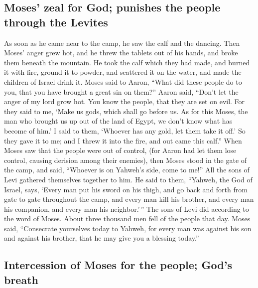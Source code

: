 \hypertarget{moses-zeal-for-god-punishes-the-people-through-the-levites}{%
\subsection{Moses' zeal for God; punishes the people through the
Levites}\label{moses-zeal-for-god-punishes-the-people-through-the-levites}}

 As soon as he came near to the camp, he saw the calf and
the dancing. Then Moses' anger grew hot, and he threw the tablets out of
his hands, and broke them beneath the mountain.  He took
the calf which they had made, and burned it with fire, ground it to
powder, and scattered it on the water, and made the children of Israel
drink it.  Moses said to Aaron, ``What did these people
do to you, that you have brought a great sin on them?'' 
Aaron said, ``Don't let the anger of my lord grow hot. You know the
people, that they are set on evil.  For they said to me,
`Make us gods, which shall go before us. As for this Moses, the man who
brought us up out of the land of Egypt, we don't know what has become of
him.'  I said to them, `Whoever has any gold, let them
take it off.' So they gave it to me; and I threw it into the fire, and
out came this calf.''  When Moses saw that the people
were out of control, (for Aaron had let them lose control, causing
derision among their enemies),  then Moses stood in the
gate of the camp, and said, ``Whoever is on Yahweh's side, come to me!''
All the sons of Levi gathered themselves together to him.
 He said to them, ``Yahweh, the God of Israel, says,
`Every man put his sword on his thigh, and go back and forth from gate
to gate throughout the camp, and every man kill his brother, and every
man his companion, and every man his neighbor.'\,''  The
sons of Levi did according to the word of Moses. About three thousand
men fell of the people that day.  Moses said,
``Consecrate yourselves today to Yahweh, for every man was against his
son and against his brother, that he may give you a blessing today.''

\hypertarget{intercession-of-moses-for-the-people-gods-breath}{%
\subsection{Intercession of Moses for the people; God's
breath}\label{intercession-of-moses-for-the-people-gods-breath}}

